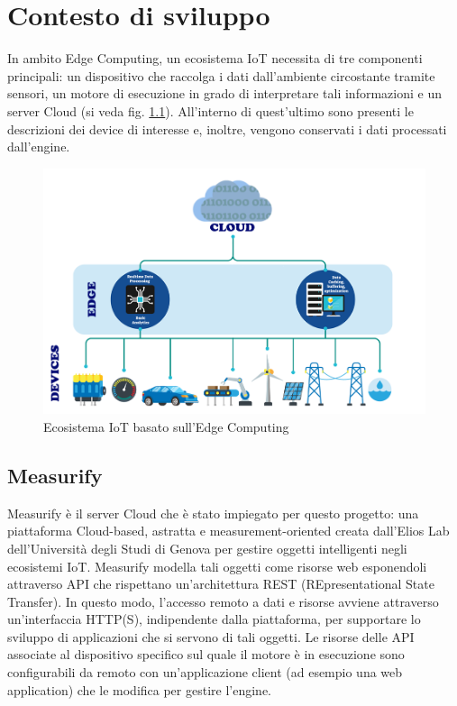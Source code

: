 \chapter{Contesto di sviluppo}
In ambito Edge Computing, un ecosistema IoT necessita di tre componenti principali: un dispositivo che raccolga i dati dall'ambiente circostante tramite sensori, un motore di esecuzione in grado di interpretare tali informazioni e un server Cloud (si veda fig. \ref{ecosistema}). All'interno di quest'ultimo sono presenti le descrizioni dei device di interesse e, inoltre, vengono conservati i dati processati dall'engine.

\begin{figure}[H]
	\centering
	\includegraphics[width=0.8\linewidth]{pics/edgestructure}
	\caption{Ecosistema IoT basato sull'Edge Computing}
	\label{ecosistema}
\end{figure}

\section{Measurify}
Measurify è il server Cloud che è stato impiegato per questo progetto: una piattaforma Cloud-based, astratta e measurement-oriented creata dall'Elios Lab dell'Università degli Studi di Genova per gestire oggetti intelligenti negli ecosistemi IoT. Measurify modella tali oggetti come risorse web esponendoli attraverso API che rispettano un'architettura REST (REpresentational State Transfer). In questo modo, l'accesso remoto a dati e risorse avviene attraverso un'interfaccia HTTP(S), indipendente dalla piattaforma, per supportare lo sviluppo di applicazioni che si servono di tali oggetti. Le risorse delle API associate al dispositivo specifico sul quale il motore è in esecuzione sono configurabili da remoto con un'applicazione client (ad esempio una web application) che le modifica per gestire l'engine.

